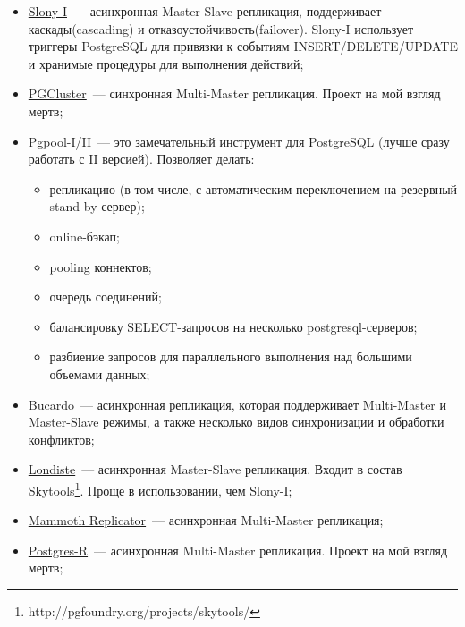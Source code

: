 \begin{itemize}
  \item \href{http://www.slony.info/}{Slony-I}~--- асинхронная Master-Slave репликация, поддерживает каскады(cascading) и отказоустойчивость(failover). Slony-I использует триггеры PostgreSQL для привязки к событиям INSERT/DELETE/UPDATE и хранимые процедуры для выполнения действий;

  \item \href{http://pgfoundry.org/projects/pgcluster/}{PGCluster}~--- синхронная Multi-Master репликация. Проект на мой взгляд мертв;

  \item \href{http://pgpool.projects.postgresql.org/}{Pgpool-I/II}~--- это замечательный инструмент для PostgreSQL (лучше сразу работать с II версией). Позволяет делать:
  \begin{itemize}
    \item репликацию (в том числе, с автоматическим переключением на резервный stand-by сервер);
    \item online-бэкап;
    \item pooling коннектов;
    \item очередь соединений;
    \item балансировку SELECT-запросов на несколько postgresql-серверов;
    \item разбиение запросов для параллельного выполнения над большими объемами данных;
  \end{itemize}

  \item \href{http://bucardo.org/}{Bucardo}~--- асинхронная репликация, которая поддерживает Multi-Master и Master-Slave режимы, а также несколько видов синхронизации и обработки конфликтов;

  \item \href{http://skytools.projects.postgresql.org/doc/londiste.ref.html}{Londiste}~--- асинхронная Master-Slave репликация. Входит в состав Skytools\footnote{http://pgfoundry.org/projects/skytools/}. Проще в использовании, чем Slony-I;

  \item \href{http://www.commandprompt.com/products/mammothreplicator/}{Mammoth Replicator}~--- асинхронная Multi-Master репликация;

  \item \href{http://www.postgres-r.org/}{Postgres-R}~--- асинхронная Multi-Master репликация. Проект на мой взгляд мертв;
\end{itemize}

